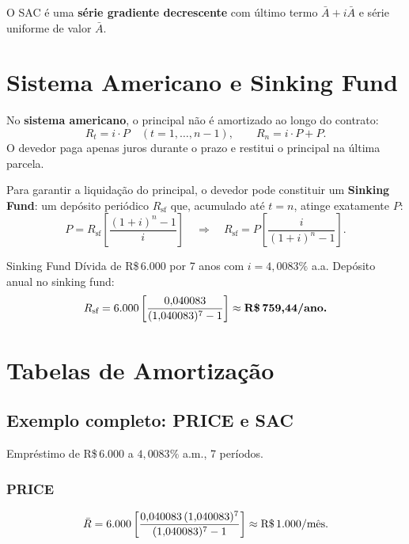 \begin{nota}
O SAC é uma \textbf{série gradiente decrescente} com último termo $\bar{A} + i\bar{A}$ e
série uniforme de valor $\bar{A}$.
\end{nota}

\section{Sistema Americano e Sinking Fund}

No \textbf{sistema americano}, o principal não é amortizado ao longo do contrato:
\[
  R_t = i\cdot P \quad (t = 1, \ldots, n-1), \qquad R_n = i\cdot P + P.
\]
O devedor paga apenas juros durante o prazo e restitui o principal na última parcela.

Para garantir a liquidação do principal, o devedor pode constituir um \textbf{Sinking Fund}:
um depósito periódico $R_{\text{sf}}$ que, acumulado até $t = n$, atinge exatamente $P$:
\[
  P = R_{\text{sf}}\left[\frac{(1+i)^n-1}{i}\right]
  \quad\Rightarrow\quad
  R_{\text{sf}} = P\left[\frac{i}{(1+i)^n-1}\right].
\]

\begin{exemplo}{Sinking Fund}
Dívida de R\$\,6.000 por 7 anos com $i = 4{,}0083\%$ a.a. Depósito anual no sinking fund:
\[
  R_{\text{sf}} = 6{.}000\left[\frac{0{,}040083}{(1{,}040083)^7-1}\right]
               \approx \textbf{R\$\,759{,}44/\text{ano.}}
\]
\end{exemplo}

\section{Tabelas de Amortização}

\subsection{Exemplo completo: PRICE e SAC}

Empréstimo de R\$\,6.000 a $4{,}0083\%$ a.m., 7 períodos.

\subsubsection*{PRICE}

\[
  \bar{R} = 6{.}000\left[\frac{0{,}040083\,(1{,}040083)^7}{(1{,}040083)^7-1}\right]
          \approx \text{R\$\,1.000/mês.}
\]

